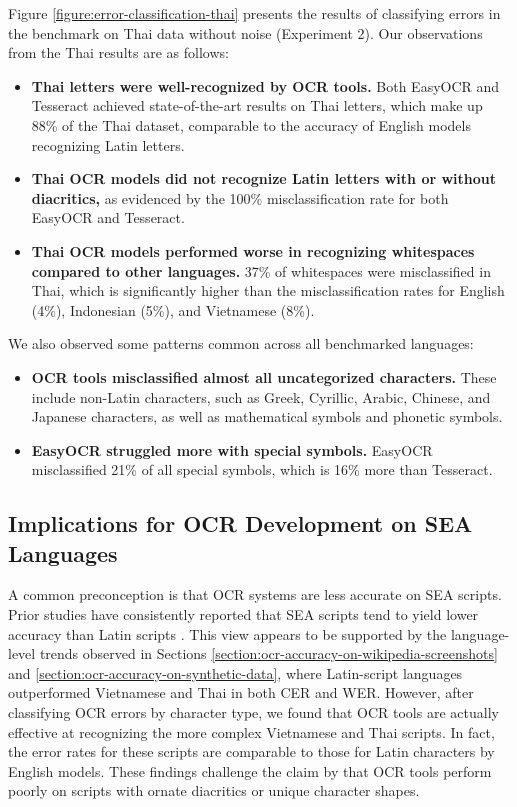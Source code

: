 \documentclass[12pt,oneside]{memoir}
\begin{document}
Figure \ref{figure:error-classification-thai} presents the results of classifying errors in the benchmark on Thai data without noise (Experiment 2). Our observations from the Thai results are as follows:

\begin{itemize}
    \item \textbf{Thai letters were well-recognized by OCR tools.} 
    Both EasyOCR and Tesseract achieved state-of-the-art results on Thai letters, which make up 88\% of the Thai dataset, comparable to the accuracy of English models recognizing Latin letters.
    \item \textbf{Thai OCR models did not recognize Latin letters with or without diacritics,} as evidenced by the 100\% misclassification rate for both EasyOCR and Tesseract.
    \item \textbf{Thai OCR models performed worse in recognizing whitespaces compared to other languages.} 37\% of whitespaces were misclassified in Thai, which is significantly higher than the misclassification rates for English (4\%), Indonesian (5\%), and Vietnamese (8\%).
\end{itemize}

We also observed some patterns common across all benchmarked languages:

\begin{itemize}
    \item \textbf{OCR tools misclassified almost all uncategorized characters.} These include non-Latin characters, such as Greek, Cyrillic, Arabic, Chinese, and Japanese characters, as well as mathematical symbols and phonetic symbols.
    \item \textbf{EasyOCR struggled more with special symbols.} EasyOCR misclassified 21\% of all special symbols, which is 16\% more than Tesseract.
\end{itemize}

\subsection{Implications for OCR Development on SEA Languages}

A common preconception is that OCR systems are less accurate on SEA scripts.
Prior studies have consistently reported that SEA scripts tend to yield lower accuracy than Latin scripts \parencite{ignat-etal-2022}.
This view appears to be supported by the language-level trends observed in Sections \ref{section:ocr-accuracy-on-wikipedia-screenshots} and \ref{section:ocr-accuracy-on-synthetic-data}, where Latin-script languages outperformed Vietnamese and Thai in both CER and WER.
However, after classifying OCR errors by character type, we found that OCR tools are actually effective at recognizing the more complex Vietnamese and Thai scripts. In fact, the error rates for these scripts are comparable to those for Latin characters by English models.
These findings challenge the claim by \textcite{agarwal-and-anastasopoulos-2024} that OCR tools perform poorly on scripts with ornate diacritics or unique character shapes.
\end{document}
